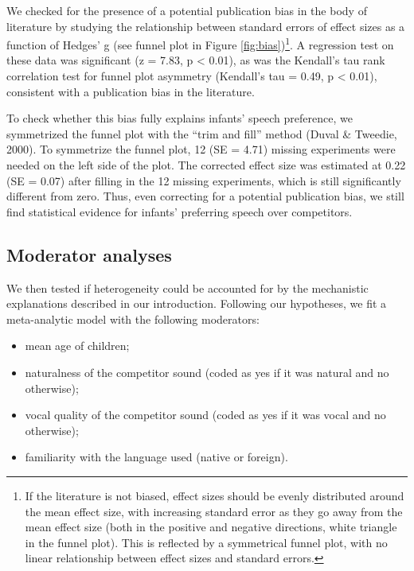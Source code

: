 \documentclass[
  english,
  man]{apa6}
\providecommand{\tightlist}{%
  \setlength{\itemsep}{0pt}\setlength{\parskip}{0pt}}
\begin{document}
We checked for the presence of a potential publication bias in the body of literature by studying the relationship between standard errors of effect sizes as a function of Hedges' g (see funnel plot in Figure \ref{fig:bias})\footnote{If the literature is not biased, effect sizes should be evenly distributed around the mean effect size, with increasing standard error as they go away from the mean effect size (both in the positive and negative directions, white triangle in the funnel plot). This is reflected by a symmetrical funnel plot, with no linear relationship between effect sizes and standard errors.}. A regression test on these data was significant (z = 7.83, p \textless{} 0.01), as was the Kendall's tau rank correlation test for funnel plot asymmetry (Kendall's tau = 0.49, p \textless{} 0.01), consistent with a publication bias in the literature.

To check whether this bias fully explains infants' speech preference, we symmetrized the funnel plot with the \enquote{trim and fill} method (Duval \& Tweedie, 2000). To symmetrize the funnel plot, 12 (SE = 4.71) missing experiments were needed on the left side of the plot. The corrected effect size was estimated at 0.22 (SE = 0.07) after filling in the 12 missing experiments, which is still significantly different from zero. Thus, even correcting for a potential publication bias, we still find statistical evidence for infants' preferring speech over competitors.

\hypertarget{moderator-analyses}{%
\subsection{Moderator analyses}\label{moderator-analyses}}

We then tested if heterogeneity could be accounted for by the mechanistic explanations described in our introduction. Following our hypotheses, we fit a meta-analytic model with the following moderators:

\begin{itemize}
\tightlist
\item
  mean age of children;
\item
  naturalness of the competitor sound (coded as yes if it was natural and no otherwise);
\item
  vocal quality of the competitor sound (coded as yes if it was vocal and no otherwise);
\item
  familiarity with the language used (native or foreign).
\end{itemize}
\end{document}
